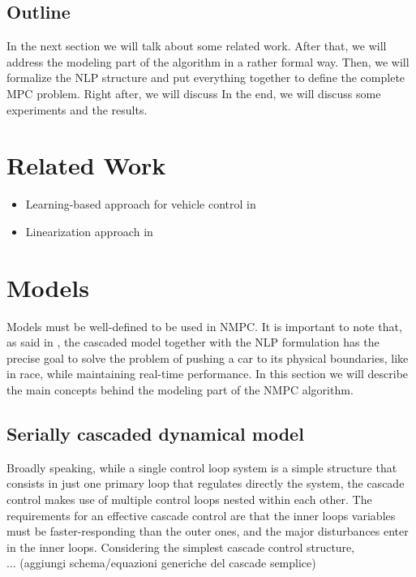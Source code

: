 \documentclass[a4paper, onecolumn, 12pt]{article}
\begin{document}
\subsection*{Outline}

In the next section we will talk about some related work. After that, we will
address the modeling part of the algorithm in a rather formal way. Then, we will
formalize the NLP structure and put everything together to define the complete
MPC problem. Right after, we will discuss In the end, we will discuss some experiments and the results.

\section{Related Work}

\begin{itemize}
    \item Learning-based approach for vehicle control in \cite{rosolia}
    \item Linearization approach in \cite{bemporad}
\end{itemize}

\newpage
\section{Models}

Models must be well-defined to be used in NMPC. It is important to note that, as
said in \cite{paper}, the cascaded model together with the NLP formulation has
the precise goal to solve the problem of pushing a car to its physical
boundaries, like in race, while maintaining real-time performance. In this
section we will describe the main concepts behind the modeling part of the NMPC
algorithm. 

\subsection{Serially cascaded dynamical model}
Broadly speaking, while a single control loop system is a simple structure that
consists in just one primary loop that regulates directly the system, the
cascade control makes use of multiple control loops nested within each other.
The requirements for an effective cascade control are that the inner loops
variables must be faster-responding than the outer ones, and the major
disturbances enter in the inner loops. Considering the simplest cascade control
structure,\\
... (aggiungi schema/equazioni generiche del cascade semplice)
\end{document}
